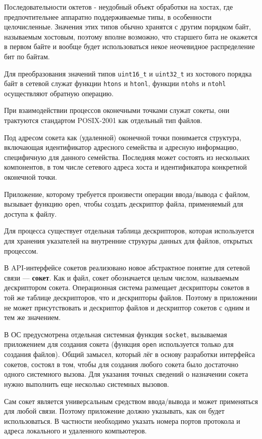 Последовательности октетов - неудобный объект обработки на хостах, где предпочтительнее аппаратно поддерживаемые типы, в особенности целочисленные. Значения этих типов обычно хранятся с другим порядком байт, называемым хостовым, поэтому вполне возможно, что старшего бита не окажется в первом байте и вообще будет использоваться некое неочевидное распределение бит по байтам. 

Для преобразования значений типов {\tt uint16\_t} и {\tt uint32\_t} из хостового порядка байт в сетевой служат функции {\tt htons} и {\tt htonl}, функции {\tt ntohs} и {\tt ntohl} осуществляют обратную операцию. 

При взаимодействии процессов оконечными точками служат сокеты, они трактуются стандартом POSIX-2001 как отдельный тип файлов.

Под адресом сокета как (удаленной) оконечной точки понимается структура, включающая идентификатор адресного семейства и адресную информацию, специфичную для данного семейства. Последняя может состоять из нескольких компонентов, в том числе сетевого адреса хоста и идентификатора конкретной оконечной точки. 

Приложение,  которому требуется произвести операции ввода/вывода с файлом, вызывает функцию {\tt open},  чтобы создать дескриптор файла,  применяемый для доступа к файлу. 

Для процесса существует отдельная таблица дескрипторов,  которая используется для хранения указателей на внутренние струкуры данных для файлов, открытых процессом.

В API-интерфейсе сокетов реализовано новое абстрактное понятие для сетевой связи –-- {\bf сокет}. Как и файл,  сокет обозначается целым числом,  называемым дескриптором сокета. Операционная система размещает дескрипторы сокетов в той же таблице дескрипторов,  что и дескрипторы файлов. Поэтому в приложении не может присутствовать и дескриптор файлов и дескриптор сокетов с одним и тем же значением.

В ОС предусмотрена отдельная системная функция {\tt socket},  вызываемая приложением для создания 
сокета (функция {\tt open} используется только для создания файлов). Общий замысел,  
который лёг в основу разработки интерфейса сокетов,  состоял в том,  чтобы для создания любого сокета
было достаточно одного системного вызова. Для указания точных сведений о назначении сокета
нужно выполнить еще несколько системных вызовов.

Сам сокет является универсальным средством ввода/вывода и может применяться для любой связи. Поэтому приложение должно указывать, как он будет использоваться. В частности необходимо указать номера портов протокола и адреса локального и удаленного компьютеров. 

